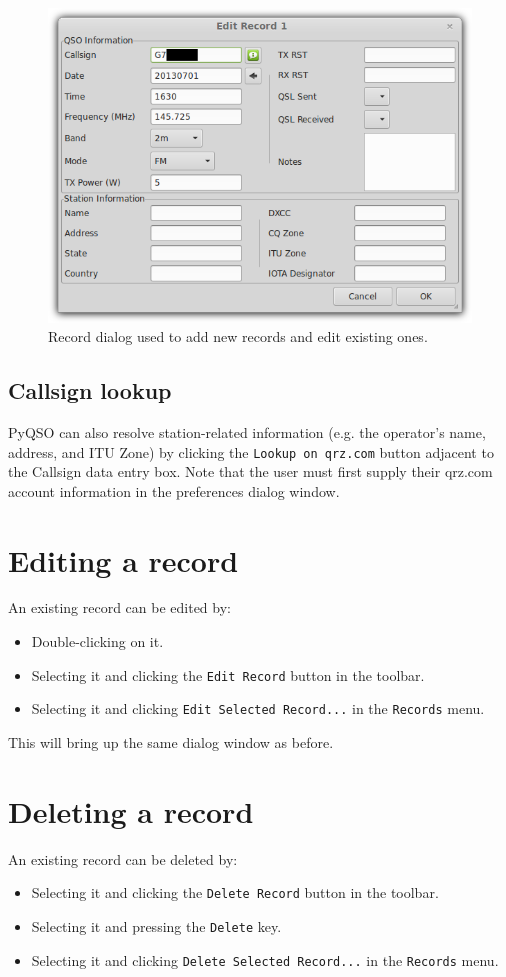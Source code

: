 \documentclass[11pt, a4paper]{report}
\begin{document}
\begin{figure}
  \centering
  \includegraphics[width=1\columnwidth]{images/edit_record.png}
  \caption{Record dialog used to add new records and edit existing ones.}
  \label{fig:edit_record}
\end{figure}

\subsection{Callsign lookup}
PyQSO can also resolve station-related information (e.g. the operator's name, address, and ITU Zone) by clicking the \texttt{Lookup on qrz.com} button adjacent to the Callsign data entry box. Note that the user must first supply their qrz.com account information in the preferences dialog window.

\section{Editing a record}
An existing record can be edited by:
\begin{itemize}
  \item Double-clicking on it.
  \item Selecting it and clicking the \texttt{Edit Record} button in the toolbar.
  \item Selecting it and clicking \texttt{Edit Selected Record...} in the \texttt{Records} menu.
\end{itemize}
This will bring up the same dialog window as before.

\section{Deleting a record}
An existing record can be deleted by:
\begin{itemize}
  \item Selecting it and clicking the \texttt{Delete Record} button in the toolbar.
  \item Selecting it and pressing the \texttt{Delete} key.
  \item Selecting it and clicking \texttt{Delete Selected Record...} in the \texttt{Records} menu.
\end{itemize}
\end{document}
